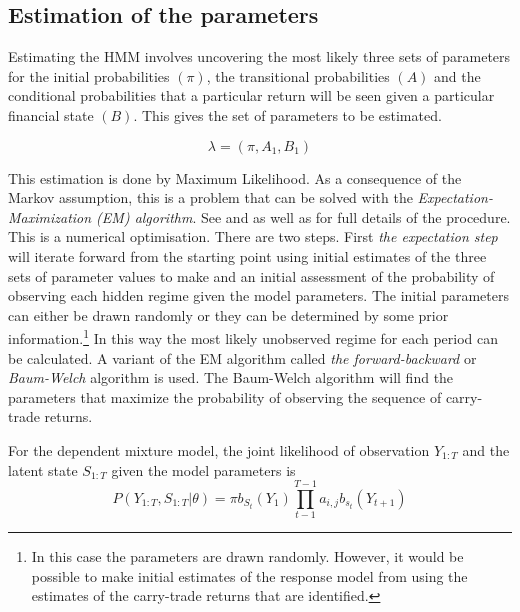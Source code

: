 \documentclass[12pt, a4paper, oneside]{article} %
\begin{document}
 
\subsection{Estimation of the parameters}
Estimating the HMM involves uncovering the most likely three sets of parameters for the initial probabilities $(\pi)$, the transitional probabilities $(A)$ and the conditional probabilities that a particular return will be seen given a particular financial state $(B)$.  This gives the set of parameters to be estimated. 

\begin{equation}
\lambda = (\pi, A_1, B_1)
\end{equation}

This estimation is done by Maximum Likelihood. As a consequence of the Markov assumption, this is a problem that can be solved with the \emph{Expectation-Maximization (EM) algorithm}.  See \citet{dempster1977maximum} and \citet{Hamilton1989} as well as \citet{depmixS4} for full details of the procedure.  This is a numerical optimisation.  There are two steps. First \emph{the expectation step} will iterate forward from the starting point using initial estimates of the three sets of parameter values  to make and an initial assessment of the probability of observing each hidden regime given the model parameters.  The initial parameters can either be drawn randomly or they can be determined by some prior information.\footnote{In this case the parameters are drawn randomly.  However, it would be possible to make initial estimates of the response model from \citet{Hayward2013} using the estimates of the carry-trade returns that are identified.}  In this way the most likely unobserved regime for each period can be calculated. A variant of the EM algorithm called \emph{the forward-backward} or \emph{Baum-Welch} algorithm \citet{Baum1970} is used.   The Baum-Welch algorithm will find the parameters that maximize the probability of observing the sequence of carry-trade returns.  

For the dependent mixture model, the joint likelihood of observation $Y_{1:T}$ and the latent state $S_{1:T}$ given the model parameters is 
\begin{equation}
P(Y_{1:T}, S_{1:T}|\theta) = \pi b_{S_t}(Y_1)\prod_{t-1}^{T-1} a_{i,j}b_{s_t}(Y_{t+1})
\end{equation}
\end{document}
